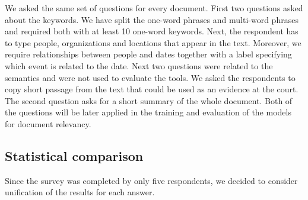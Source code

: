 \documentclass[
  digital, %
  table,   %
  lof,     %
  lot,     %
]{fithesis3}
\begin{document}
We asked the same set of questions for every document.
First two questions asked about the keywords.
We have split the one-word phrases and multi-word phrases and required both with at least 10 one-word keywords.
Next, the respondent has to type people, organizations and locations that appear in the text.
Moreover, we require relationships between people and dates together with a label specifying which event is related to the date.
Next two questions were related to the semantics and were not used to evaluate the tools.
We asked the respondents to copy short passage from the text that could be used as an evidence at the court.
The second question asks for a short summary of the whole document.
Both of the questions will be later applied in the training and evaluation of the models
for document relevancy.


\subsection{Statistical comparison}
Since the survey was completed by only five respondents, we decided to consider unification of the results for each answer.
\end{document}
